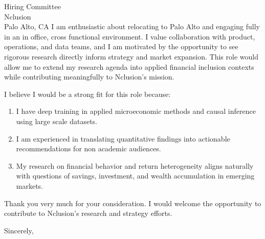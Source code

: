 \documentclass[11pt,letterpaper]{letter}
\begin{document}
\begin{letter}{
Hiring Committee \\
Nclusion \\
Palo Alto, CA
}
I am enthusiastic about relocating to Palo Alto and engaging fully in an in office, cross functional environment. I value collaboration with product, operations, and data teams, and I am motivated by the opportunity to see rigorous research directly inform strategy and market expansion. This role would allow me to extend my research agenda into applied financial inclusion contexts while contributing meaningfully to Nclusion’s mission.

I believe I would be a strong fit for this role because:
\begin{enumerate}
    \item I have deep training in applied microeconomic methods and causal inference using large scale datasets.
    \item I am experienced in translating quantitative findings into actionable recommendations for non academic audiences.
    \item My research on financial behavior and return heterogeneity aligns naturally with questions of savings, investment, and wealth accumulation in emerging markets.
\end{enumerate}

Thank you very much for your consideration. I would welcome the opportunity to contribute to Nclusion’s research and strategy efforts.

\closing{Sincerely,}

\end{letter}
\end{document}
